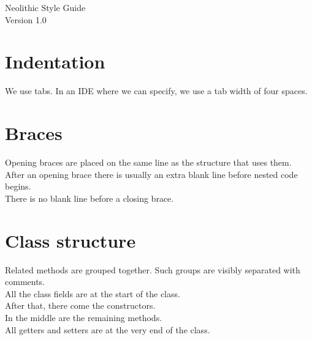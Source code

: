 \documentclass[10pt,a4paper]{report}
\author{Michael Plüss}
\begin{document}
\Huge{Neolithic Style Guide}\\
\normalsize{Version 1.0}\\

\section{Indentation}

We use tabs. In an IDE where we can specify, we use a tab width of four spaces.\\

\section{Braces}

Opening braces are placed on the same line as the structure that uses them.\\
After an opening brace there is usually an extra blank line before nested code begins.\\
There is no blank line before a closing brace.\\

\section{Class structure}

Related methods are grouped together. Such groups are visibly separated with comments.\\
All the class fields are at the start of the class.\\
After that, there come the constructors.\\
In the middle are the remaining methods.\\
All getters and setters are at the very end of the class.\\
\end{document}
